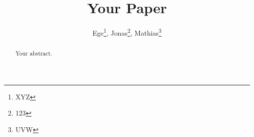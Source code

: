 \documentclass{article}
\title{Your Paper}
\author{Ege\thanks{XYZ}, Jonas\thanks{123}, Mathias\thanks{UVW}}
\begin{document}
\maketitle

\begin{abstract}
    Your abstract.
\end{abstract}
\end{document}
